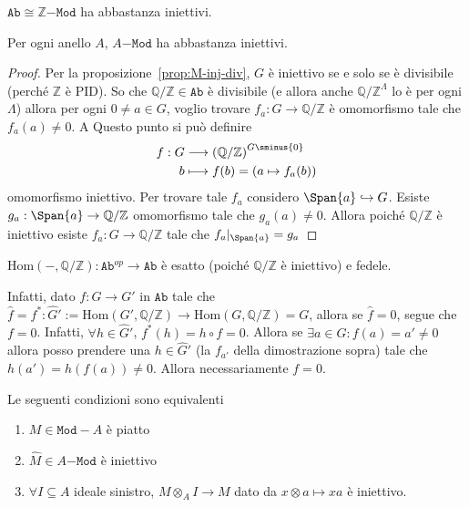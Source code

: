 \begin{proposition}{}
    \(\mathtt{Ab} \cong \mathbb{Z}\mathtt{-Mod}\) ha abbastanza iniettivi.
\end{proposition}
\begin{corollary}{}
    Per ogni anello \(A\), \(A\mathtt{-Mod}\) ha abbastanza iniettivi.
\end{corollary}
\begin{proof}{}
    Per la proposizione~\ref{prop:M-inj-div}, \(G\) è iniettivo se e solo se è
    divisibile (perché \(\mathbb{Z}\) è PID). So che \(\mathbb{Q}/\mathbb{Z} \in
    \mathtt{Ab}\) è divisibile (e allora anche \(\mathbb{Q}/\mathbb{Z} ^{\Lambda}
    \) lo è per ogni \(\Lambda\)) allora per ogni \(0 \neq a \in G\), voglio
    trovare \(f_a : G
    \to \mathbb{Q}/\mathbb{Z}\) è omomorfismo tale che \(f_a{(a)} \neq 0\). A
    Questo punto si può definire 
    \begin{align*}
        f: G &\longrightarrow {(\mathbb{Q}/\mathbb{Z})}^{G \sminus \{0\} } \\
        b &\longmapsto f(b) = {(a \mapsto f_a{(b)})}
    \end{align*}
    omomorfismo iniettivo. Per trovare tale \(f_a\) considero \(\Span{a}
    \hookrightarrow G\). Esiste \(g_a : \Span{a} \to \mathbb{Q}/\mathbb{Z}\)
    omomorfismo tale che \(g_a{(a)} \neq 0\). Allora poiché
    \(\mathbb{Q}/\mathbb{Z}\) è iniettivo esiste \(f_a : G \to
    \mathbb{Q}/\mathbb{Z}\) tale che \(f_a|_{\Span{a} } = g_a\) 
\end{proof}

\begin{remark}{}
    \(\mathrm{Hom}{(-, \mathbb{Q}/\mathbb{Z})} : \mathtt{Ab}^{op} \to
    \mathtt{Ab}\) è esatto (poiché \(\mathbb{Q}/\mathbb{Z}\) è iniettivo) e
    fedele.
    
    Infatti, dato \(f : G \to G'\) in \(\mathtt{Ab}\) tale che \(\widehat{f} = f^{*}
    : \widehat{G}' := \mathrm{Hom}{(G', \mathbb{Q}/\mathbb{Z})} \to \mathrm{Hom}{(G,
    \mathbb{Q}/\mathbb{Z})} = G\), allora se \(\widehat{f} = 0\), segue che \(f =
    0\). Infatti, \(\forall h \in \widehat{G}'\), \(f^{*}{(h)} = h \circ f = 0\).
    Allora se \(\exists a \in G : f{(a)} = a' \neq 0\) allora posso prendere una
    \(h \in \widehat{G}'\) (la \(f_{a'}\) della dimostrazione sopra) tale che
    \(h{(a')} = h{(f{(a)})} \neq 0\). Allora necessariamente \(f = 0\).
\end{remark}

\begin{proposition}{}
    Le seguenti condizioni sono equivalenti
\begin{enumerate}[label = \roman*)]
    \item \(M \in \mathtt{Mod}-A\) è piatto
    \item \(\widehat{M} \in A\mathtt{-Mod}\) è iniettivo
    \item \(\forall I \subseteq A \) ideale sinistro, \(M \otimes_A I \to M\)
        dato da \(x \otimes a \mapsto xa\) è iniettivo.
\end{enumerate}
\end{proposition}

